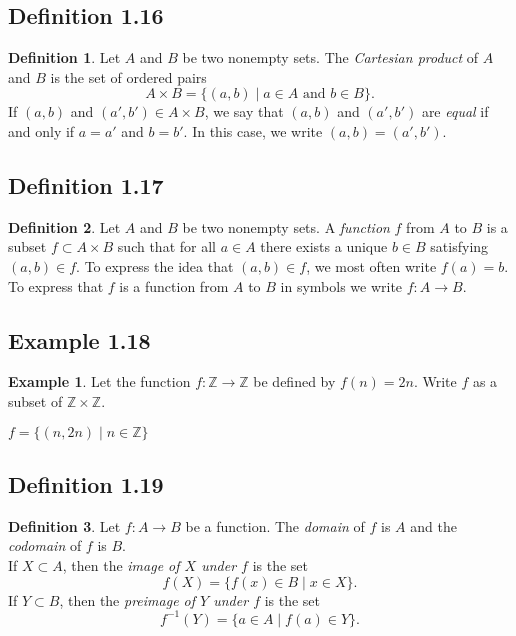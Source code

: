 \documentclass[openany, amssymb, psamsfonts]{amsart}
\theoremstyle{definition}
\newtheorem{defn}{Definition}[section]
\newtheorem{exmp}{Example}[section]
\numberwithin{equation}{section}
\begin{document}
\subsection{Definition 1.16}
\begin{defn}
Let $A$ and $B$ be two nonempty sets. 
The \emph{Cartesian product} of $A$ and $B$ is the set of ordered pairs
\[
A \times B = \{ (a, b) \mid \text{$a \in A$ and $b \in B$} \}.
\]
If $(a, b)$ and $(a', b') \in A \times B$, we say that $(a, b)$ and $(a', b')$ are
\emph{equal} if and only if $a = a'$ and $b = b'$. In this case, we write $
(a, b) = (a', b').$
\end{defn} 
\subsection{Definition 1.17}
\begin{defn} Let $A$ and $B$ be two nonempty sets.  
A \emph{function} $f$ from $A$ to $B$ is a subset $f \subset A \times B$ such that for all $a \in A$ there exists a unique $b \in B$ satisfying $(a, b) \in f$.  To express the idea that $(a, b) \in f$, we most
often write $f(a) = b$.  To express that $f$ is a function from $A$ to $B$ in symbols we write $f \colon A \rightarrow B$.  
\end{defn}
\subsection{Example 1.18}
\begin{exmp}  
Let the function $f \colon \mathbb{Z} \rightarrow \mathbb{Z}$ be defined by
$f(n)=2n$.  Write $f$ as a subset of $\mathbb{Z} \times \mathbb{Z}$.  

$f=\{ (n, 2n) \mid n \in \mathbb Z\}$



\end{exmp}
\subsection{Definition 1.19}
\begin{defn}
Let $f \colon A \rightarrow B$ be a function.  The \emph{domain} of $f$ is $A$ and the \emph{codomain} of $f$ is $B.$\\
If $X \subset A$, then the \emph{image of $X$ under $f$} is the set
\[
f(X) = \{ f(x) \in B \mid  x \in X \}.
\]
If $Y \subset B$, then the \emph{preimage of $Y$ under $f$} is the set
\[
f^{-1}(Y) = \{ a \in A \mid f(a) \in Y \}.
\]
\end{defn}
\end{document}
